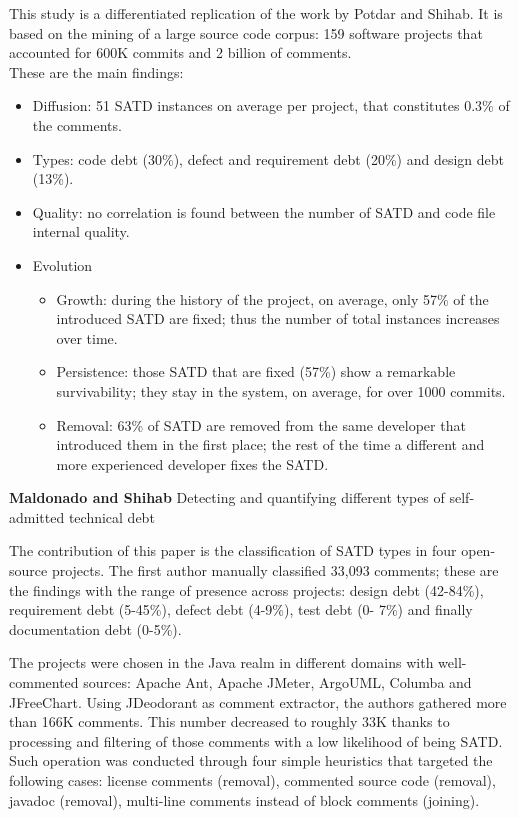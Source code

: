 This study is a differentiated replication of the work by Potdar and Shihab. It is based on the mining of a large source code corpus: 159 software projects that accounted for 600K commits and 2 billion of comments. 
\\
These are the main findings:
\begin{itemize}
\item Diffusion: 51 SATD instances on average per project, that constitutes 0.3\% of the comments.
\item Types: code debt (30\%), defect and requirement debt (20\%) and design debt (13\%).
\item Quality: no correlation is found between the number of SATD and code file internal quality.
\item Evolution
\begin{itemize}
\item Growth: during the history of the project, on average, only 57\% of the introduced SATD are fixed; thus the number of total instances increases over time.
\item Persistence:  those SATD that are fixed (57\%) show a remarkable survivability; they stay in the system, on average, for over 1000 commits.
\item Removal: 63\% of SATD are removed from the same developer that introduced them in the first place; the rest of the time a different and more experienced developer fixes the SATD.
\end{itemize}
\end{itemize}



\textbf{Maldonado and Shihab} \cite{maldonado2015detecting} Detecting and quantifying different types of self-admitted technical debt

The contribution of this paper is the classification of SATD types in four open-source projects. The first author manually classified 33,093 comments; these are the findings with the range of presence across projects: design debt (42-84\%), requirement debt (5-45\%), defect debt (4-9\%), test debt (0- 7\%) and finally documentation debt (0-5\%).

The projects were chosen in the Java realm in different domains with well-commented sources: Apache Ant, Apache JMeter, ArgoUML, Columba and JFreeChart. 
Using JDeodorant as comment extractor, the authors gathered more than 166K comments. This number decreased to roughly 33K thanks to processing and filtering of those comments with a low likelihood of being SATD. Such operation was conducted through four simple heuristics that targeted the following cases: license comments (removal), commented source code (removal), javadoc (removal), multi-line comments instead of block comments (joining). 

